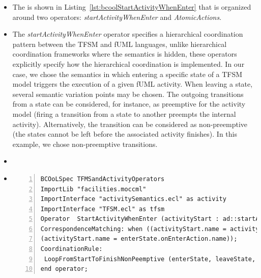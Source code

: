 	
	\begin{itemize}
		\item The \bcool is shown in Listing~\ref{lst:bcoolStartActivityWhenEnter} that is organized around two operators: \emph{startActivityWhenEnter} and \emph{AtomicActions}. 
		
		
		\item  The \emph{startActivityWhenEnter} operator specifies a hierarchical coordination pattern between the TFSM and fUML languages, unlike hierarchical coordination frameworks where the semantics is hidden, these operators explicitly specify how the hierarchical coordination is implemented. In our case, we chose the semantics in which entering a specific state of a TFSM model triggers the execution of a given fUML activity. When leaving a state, several semantic variation points may be chosen. The outgoing transitions from a state can be considered, for instance, as preemptive for the activity model (\ie firing a transition from a state to another preempts the internal activity). Alternatively, the transition can be considered as non-preemptive (\ie the states cannot be left before the associated activity finishes). In this example, we chose non-preemptive transitions.
		
		\item {} 
		
		\item {}
		
		
\begin{lstlisting}[language=bcool,
			caption={Hierarchical operator between TFSM and fUML languages},
			label={lst:bcoolStartActivityWhenEnter}, 
			basicstyle=\scriptsize\ttfamily, backgroundcolor=\color{LGrey}, numbers=left, xleftmargin=2pt]
BCOoLSpec TFMSandActivityOperators
ImportLib "facilities.moccml"
ImportInterface "activitySemantics.ecl" as activity
ImportInterface "TFSM.ecl" as tfsm
Operator  StartActivityWhenEnter (activityStart : ad::startActivity , activityStop : ad::finishActivity, enterState : tfsm::entering, leaveState : tfsm::leaving)
CorrespondenceMatching: when ((activityStart.name = activityStop.name ) and (enterState.name = leaveState.name) and
(activityStart.name = enterState.onEnterAction.name));
CoordinationRule: 
 LoopFromStartToFinishNonPeemptive (enterState, leaveState, activityStart, activityStop)
end operator;
\end{lstlisting}
		

\end{itemize}
